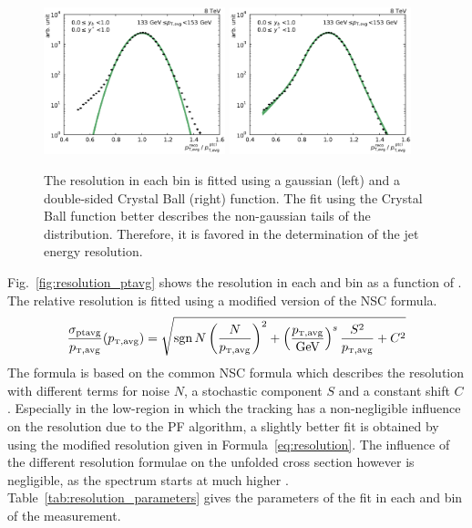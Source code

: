 \begin{figure}[h!tbp]
    \centering
    \includegraphics[width=0.47\textwidth]{figures/measurement/resolution_yb0ys0_bin10.pdf}\hfill
    \includegraphics[width=0.47\textwidth]{figures/measurement/resolution_yb0ys0_bin10_cb.pdf}
    \caption[Gaussian and Crystal Ball fit of resolution.]{The resolution in
        each \ptavg bin is fitted using a gaussian (left) and a double-sided Crystal Ball
        (right) function. The fit using the Crystal Ball function better describes the
        non-gaussian tails of the distribution. Therefore, it is favored in the
    determination of the jet energy resolution.}
    \label{fig:resolution_bin}
\end{figure}

Fig.~\ref{fig:resolution_ptavg} shows the resolution in each \ystar and
\yboost bin as a function of \ptavg. The relative resolution is fitted using a
modified version of the NSC formula.
%
\begin{equation}
    \frac{\sigma_{\text{ptavg}}}{\ptavg} (\ptavg) = \sqrt{\sgn{N} \left(\frac{N}{\ptavg}\right)^2 + \left(\frac{\ptavg}{\text{GeV}}\right)^s \frac{S^2}{\ptavg} + C^2 }
    \label{eq:resolution}
\end{equation}
%
The formula is based on the common NSC formula which describes the resolution
with different terms for noise $N$, a stochastic component $S$ and a constant
shift $C$.  Especially in the low-\pt region in which the tracking has a
non-negligible influence on the resolution due to the PF algorithm, a
slightly better fit is obtained by using the modified resolution given in
Formula~\ref{eq:resolution}. The influence of the different resolution formulae
on the unfolded cross section however is negligible, as the spectrum starts at
much higher \ptavg. Table~\ref{tab:resolution_parameters} gives the parameters of
the fit in each \ystar and \yboost bin of the measurement.


